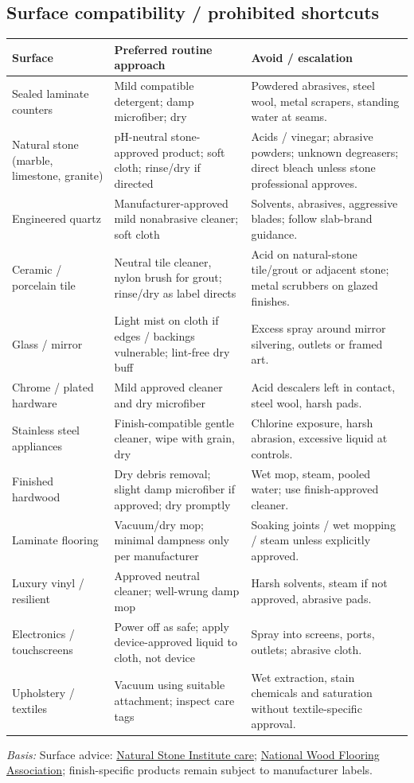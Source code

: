 \documentclass[10pt,letterpaper,oneside]{article}
\newcommand{\sources}[1]{\par{\small\color{graytext}\textit{Basis:} #1}\par}
\newcommand{\refurl}[2]{\href{#2}{#1}}
\newcommand{\smalltable}{\par\small\renewcommand{\arraystretch}{1.24}}
\newcommand{\restorenormalfonttable}{\par\normalsize\renewcommand{\arraystretch}{1}}
\begin{document}
\subsection{Surface compatibility / prohibited shortcuts}
\smalltable\begin{longtable}{>{\raggedright\arraybackslash}p{.23\linewidth}>{\raggedright\arraybackslash}p{.30\linewidth}>{\raggedright\arraybackslash}p{.36\linewidth}}\toprule
Surface & Preferred routine approach & Avoid / escalation\\\midrule\endhead
Sealed laminate counters & Mild compatible detergent; damp microfiber; dry & Powdered abrasives, steel wool, metal scrapers, standing water at seams.\\
Natural stone (marble, limestone, granite) & pH-neutral stone-approved product; soft cloth; rinse/dry if directed & Acids / vinegar; abrasive powders; unknown degreasers; direct bleach unless stone professional approves.\\
Engineered quartz & Manufacturer-approved mild nonabrasive cleaner; soft cloth & Solvents, abrasives, aggressive blades; follow slab-brand guidance.\\
Ceramic / porcelain tile & Neutral tile cleaner, nylon brush for grout; rinse/dry as label directs & Acid on natural-stone tile/grout or adjacent stone; metal scrubbers on glazed finishes.\\
Glass / mirror & Light mist on cloth if edges / backings vulnerable; lint-free dry buff & Excess spray around mirror silvering, outlets or framed art.\\
Chrome / plated hardware & Mild approved cleaner and dry microfiber & Acid descalers left in contact, steel wool, harsh pads.\\
Stainless steel appliances & Finish-compatible gentle cleaner, wipe with grain, dry & Chlorine exposure, harsh abrasion, excessive liquid at controls.\\
Finished hardwood & Dry debris removal; slight damp microfiber if approved; dry promptly & Wet mop, steam, pooled water; use finish-approved cleaner.\\
Laminate flooring & Vacuum/dry mop; minimal dampness only per manufacturer & Soaking joints / wet mopping / steam unless explicitly approved.\\
Luxury vinyl / resilient & Approved neutral cleaner; well-wrung damp mop & Harsh solvents, steam if not approved, abrasive pads.\\
Electronics / touchscreens & Power off as safe; apply device-approved liquid to cloth, not device & Spray into screens, ports, outlets; abrasive cloth.\\
Upholstery / textiles & Vacuum using suitable attachment; inspect care tags & Wet extraction, stain chemicals and saturation without textile-specific approval.\\\bottomrule\end{longtable}\restorenormalfonttable
\sources{Surface advice: \refurl{Natural Stone Institute care}{https://www.naturalstoneinstitute.org/consumers/care/}; \refurl{National Wood Flooring Association}{https://woodfloors.org/maintenance/}; finish-specific products remain subject to manufacturer labels.}
\end{document}
